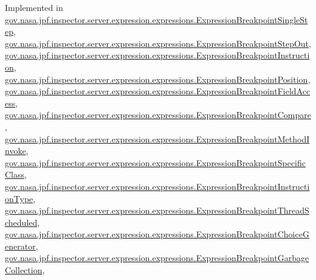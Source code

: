 Implemented in \hyperlink{classgov_1_1nasa_1_1jpf_1_1inspector_1_1server_1_1expression_1_1expressions_1_1_expression_breakpoint_single_step_a3999bbf1774b1187f41001f9db9b5c1a}{gov.\+nasa.\+jpf.\+inspector.\+server.\+expression.\+expressions.\+Expression\+Breakpoint\+Single\+Step}, \hyperlink{classgov_1_1nasa_1_1jpf_1_1inspector_1_1server_1_1expression_1_1expressions_1_1_expression_breakpoint_step_out_a6440be0795b507ebd76ca3f3e7961811}{gov.\+nasa.\+jpf.\+inspector.\+server.\+expression.\+expressions.\+Expression\+Breakpoint\+Step\+Out}, \hyperlink{classgov_1_1nasa_1_1jpf_1_1inspector_1_1server_1_1expression_1_1expressions_1_1_expression_breakpoint_instruction_a9fce761f3dafa426c52a8440a4aff369}{gov.\+nasa.\+jpf.\+inspector.\+server.\+expression.\+expressions.\+Expression\+Breakpoint\+Instruction}, \hyperlink{classgov_1_1nasa_1_1jpf_1_1inspector_1_1server_1_1expression_1_1expressions_1_1_expression_breakpoint_position_a79a13d6555f1168da4468a1fada1e04c}{gov.\+nasa.\+jpf.\+inspector.\+server.\+expression.\+expressions.\+Expression\+Breakpoint\+Position}, \hyperlink{classgov_1_1nasa_1_1jpf_1_1inspector_1_1server_1_1expression_1_1expressions_1_1_expression_breakpoint_field_access_a8f8daa3d95960df8ec8b528342711473}{gov.\+nasa.\+jpf.\+inspector.\+server.\+expression.\+expressions.\+Expression\+Breakpoint\+Field\+Access}, \hyperlink{classgov_1_1nasa_1_1jpf_1_1inspector_1_1server_1_1expression_1_1expressions_1_1_expression_breakpoint_compare_ab02c8653b90c737352ef8d937dc92c6a}{gov.\+nasa.\+jpf.\+inspector.\+server.\+expression.\+expressions.\+Expression\+Breakpoint\+Compare}, \hyperlink{classgov_1_1nasa_1_1jpf_1_1inspector_1_1server_1_1expression_1_1expressions_1_1_expression_breakpoint_method_invoke_ae5d9d2d66f9c33250a58aa87675f8a4e}{gov.\+nasa.\+jpf.\+inspector.\+server.\+expression.\+expressions.\+Expression\+Breakpoint\+Method\+Invoke}, \hyperlink{classgov_1_1nasa_1_1jpf_1_1inspector_1_1server_1_1expression_1_1expressions_1_1_expression_breakpoint_specific_class_a9ae7ea773a81bfacb58425dda46ad31d}{gov.\+nasa.\+jpf.\+inspector.\+server.\+expression.\+expressions.\+Expression\+Breakpoint\+Specific\+Class}, \hyperlink{classgov_1_1nasa_1_1jpf_1_1inspector_1_1server_1_1expression_1_1expressions_1_1_expression_breakpoint_instruction_type_a9143d6d205ca4394e59439cef8a8cede}{gov.\+nasa.\+jpf.\+inspector.\+server.\+expression.\+expressions.\+Expression\+Breakpoint\+Instruction\+Type}, \hyperlink{classgov_1_1nasa_1_1jpf_1_1inspector_1_1server_1_1expression_1_1expressions_1_1_expression_breakpoint_thread_scheduled_af4d7f87f622cea92aeaf4bdfe7d277b7}{gov.\+nasa.\+jpf.\+inspector.\+server.\+expression.\+expressions.\+Expression\+Breakpoint\+Thread\+Scheduled}, \hyperlink{classgov_1_1nasa_1_1jpf_1_1inspector_1_1server_1_1expression_1_1expressions_1_1_expression_breakpoint_choice_generator_aec1ca74841249340ec4ace864c69b39f}{gov.\+nasa.\+jpf.\+inspector.\+server.\+expression.\+expressions.\+Expression\+Breakpoint\+Choice\+Generator}, \hyperlink{classgov_1_1nasa_1_1jpf_1_1inspector_1_1server_1_1expression_1_1expressions_1_1_expression_breakpoint_garbage_collection_a481c3964677fe6412643edc5e2bd517a}{gov.\+nasa.\+jpf.\+inspector.\+server.\+expression.\+expressions.\+Expression\+Breakpoint\+Garbage\+Collection}, 